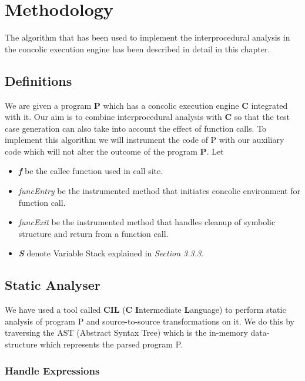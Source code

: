 \documentclass[12pt,oneside]{book}
\begin{document}
\newpage


\chapter{Methodology}
The algorithm that has been used to implement the interprocedural analysis in the concolic execution engine has been described in detail in this chapter.

\section{Definitions}

We are given a program \textbf{P} which has a concolic execution engine \textbf{C} integrated with it. Our aim is to combine interprocedural analysis with \textbf{C} so that the test case generation can also take into account the effect of function calls. To implement this algorithm we will instrument the code of P with our auxiliary code which will not alter the outcome of the program \textbf{P}. Let 

\begin{itemize}
\setlength\itemsep{0em}
  \item \textit{\textbf{f}} be the callee function used in call site.
 \item \textit{funcEntry} be the instrumented method that initiates concolic environment for function call.
 \item \textit{funcExit} be the instrumented method that handles cleanup of symbolic structure and return from a function call.
 \item \textit{\textbf{S}} denote Variable Stack explained in \textit{Section 3.3.3}.  
\end{itemize}

\section{Static Analyser}
We have used a tool called \textbf{CIL}\cite{cilapi} (\textbf{C} \textbf{I}ntermediate \textbf{L}anguage) to perform static analysis of program P and source-to-source transformations on it. We do this by traversing the AST (Abstract Syntax Tree) which is the in-memory data-structure which represents the parsed program P.

\subsection{Handle Expressions}
\end{document}
